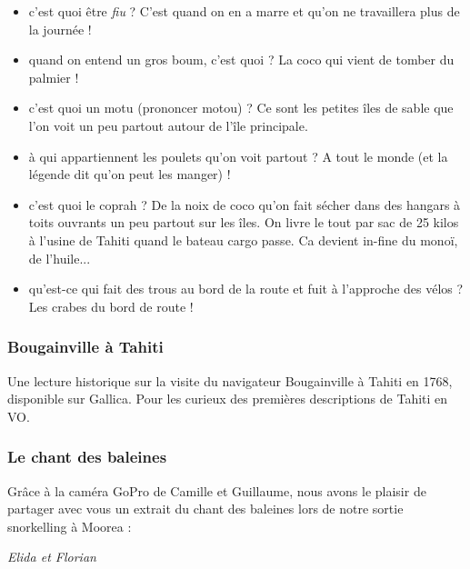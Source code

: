 \begin{itemize}
\tightlist
\item
  c'est quoi être \emph{fiu} ? C'est quand on en a marre et qu'on ne
  travaillera plus de la journée !
\item
  quand on entend un gros boum, c'est quoi ? La coco qui vient de tomber
  du palmier !
\item
  c'est quoi un motu (prononcer motou) ? Ce sont les petites îles de
  sable que l'on voit un peu partout autour de l'île principale.
\item
  à qui appartiennent les poulets qu'on voit partout ? A tout le monde
  (et la légende dit qu'on peut les manger) !
\item
  c'est quoi le coprah ? De la noix de coco qu'on fait sécher dans des
  hangars à toits ouvrants un peu partout sur les îles. On livre le tout
  par sac de 25 kilos à l'usine de Tahiti quand le bateau cargo passe.
  Ca devient in-fine du monoï, de l'huile...
\item
  qu'est-ce qui fait des trous au bord de la route et fuit à l'approche
  des vélos ? Les crabes du bord de route !
\end{itemize}

\hypertarget{bougainville-uxe0-tahiti}{%
\subsubsection{Bougainville à Tahiti}\label{bougainville-uxe0-tahiti}}

Une lecture historique sur la visite du navigateur Bougainville à Tahiti
en 1768, disponible sur Gallica. Pour les curieux des premières
descriptions de Tahiti en VO.

\hypertarget{le-chant-des-baleines}{%
\subsubsection{Le chant des baleines}\label{le-chant-des-baleines}}

Grâce à la caméra GoPro de Camille et Guillaume, nous avons le plaisir
de partager avec vous un extrait du chant des baleines lors de notre
sortie snorkelling à Moorea :

\emph{Elida et Florian}
